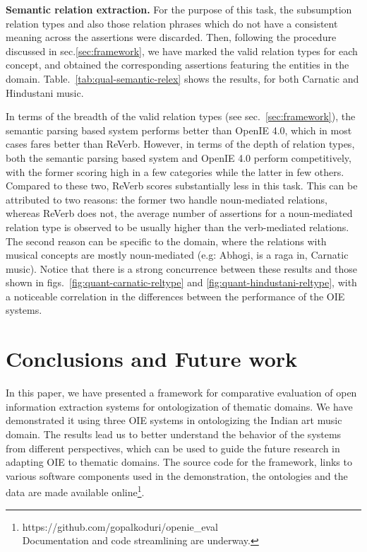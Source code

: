 \documentclass{llncs}
\begin{document}
\medskip
\noindent
\textbf{Semantic relation extraction.}
For the purpose of this task, the subsumption relation types and also those relation phrases which do not have a consistent meaning across the assertions were discarded. Then, following the procedure discussed in sec.\ref{sec:framework}, we have marked the valid relation types for each concept, and obtained the corresponding assertions featuring the entities in the domain. Table.~\ref{tab:qual-semantic-relex} shows the results, for both Carnatic and Hindustani music. 

In terms of the breadth of the valid relation types (see sec.~\ref{sec:framework}), the semantic parsing based system performs better than OpenIE 4.0, which in most cases fares better than ReVerb. However, in terms of the depth of relation types, both the semantic parsing based system and OpenIE 4.0 perform competitively, with the former scoring high in a few categories while the latter in few others. Compared to these two, ReVerb scores substantially less in this task. This can be attributed to two reasons: the former two handle noun-mediated relations, whereas ReVerb does not, the average number of assertions for a noun-mediated relation type is observed to be usually higher than the verb-mediated relations. The second reason can be specific to the domain, where the relations with musical concepts are mostly noun-mediated (e.g: Abhogi, is a raga in, Carnatic music). Notice that there is a strong concurrence between these results and those shown in figs.~\ref{fig:quant-carnatic-reltype} and \ref{fig:quant-hindustani-reltype}, with a noticeable correlation in the differences between the performance of the OIE systems.

\section{Conclusions and Future work}
\label{sec:conclusions}
In this paper, we have presented a framework for comparative evaluation of open information extraction systems for ontologization of thematic domains. We have demonstrated it using three OIE systems in ontologizing the Indian art music domain. The results lead us to better understand the behavior of the systems from different perspectives, which can be used to guide the future research in adapting OIE to thematic domains. The source code for the framework, links to various software components used in the demonstration, the ontologies and the data are made available online\footnote{https://github.com/gopalkoduri/openie\_eval\\Documentation and code streamlining are underway.}. 
\end{document}
